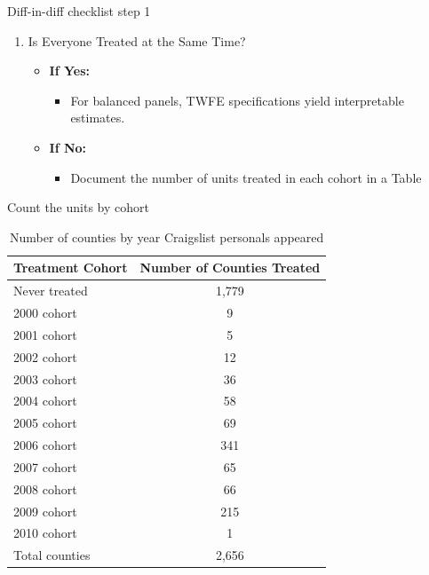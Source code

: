 \documentclass{beamer}
\begin{document}
\begin{frame}{Diff-in-diff checklist step 1}

\begin{enumerate}
\item[1. ] Is Everyone Treated at the Same Time?
    \begin{itemize}
        \item \textbf{If Yes:} 
        \begin{itemize}
            \item For balanced panels, TWFE specifications yield interpretable estimates.
        \end{itemize}
        \item \textbf{If No:} 
        \begin{itemize}
            \item Document the number of units treated in each cohort in a Table
        \end{itemize}
    \end{itemize}
    \end{enumerate}
\end{frame}

\begin{frame}{Count the units by cohort}

\begin{table}[htbp]\centering
\footnotesize
\caption{Number of counties by year Craigslist personals appeared}\label{tab:countybycohort}
\begin{tabular}{lc}
\toprule
\textbf{Treatment Cohort} & \textbf{Number of Counties Treated} \\
\midrule
Never treated&       1,779\\
2000 cohort &           9\\
2001 cohort &           5\\
2002 cohort &          12\\
2003 cohort &          36\\
2004 cohort &          58\\
2005 cohort &          69\\
2006 cohort &         341\\
2007 cohort &          65\\
2008 cohort &          66\\
2009 cohort &         215\\
2010 cohort &           1\\
\midrule
Total counties &     2,656 \\
\bottomrule
\end{tabular}
\end{table}

\end{frame}
\end{document}
